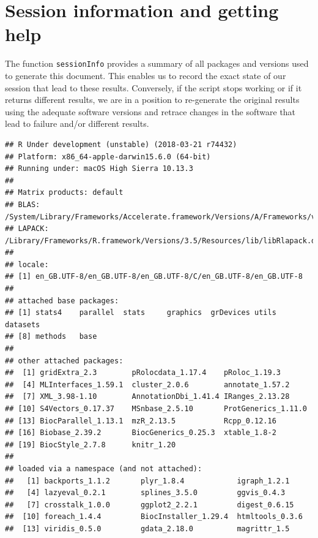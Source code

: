 \section*{Session information and getting help}

The function \texttt{sessionInfo} provides a summary of all packages
and versions used to generate this document. This enables us to record
the exact state of our session that lead to these results. Conversely,
if the script stops working or if it returns different results, we are
in a position to re-generate the original results using the adequate
software versions and retrace changes in the software that lead to
failure and/or different results.

\begin{knitrout}
\color{fgcolor}\begin{kframe}
\begin{alltt}
\hlstd{()}
\end{alltt}
\begin{verbatim}
## R Under development (unstable) (2018-03-21 r74432)
## Platform: x86_64-apple-darwin15.6.0 (64-bit)
## Running under: macOS High Sierra 10.13.3
## 
## Matrix products: default
## BLAS: /System/Library/Frameworks/Accelerate.framework/Versions/A/Frameworks/vecLib.framework/Versions/A/libBLAS.dylib
## LAPACK: /Library/Frameworks/R.framework/Versions/3.5/Resources/lib/libRlapack.dylib
## 
## locale:
## [1] en_GB.UTF-8/en_GB.UTF-8/en_GB.UTF-8/C/en_GB.UTF-8/en_GB.UTF-8
## 
## attached base packages:
## [1] stats4    parallel  stats     graphics  grDevices utils     datasets 
## [8] methods   base     
## 
## other attached packages:
##  [1] gridExtra_2.3        pRolocdata_1.17.4    pRoloc_1.19.3       
##  [4] MLInterfaces_1.59.1  cluster_2.0.6        annotate_1.57.2     
##  [7] XML_3.98-1.10        AnnotationDbi_1.41.4 IRanges_2.13.28     
## [10] S4Vectors_0.17.37    MSnbase_2.5.10       ProtGenerics_1.11.0 
## [13] BiocParallel_1.13.1  mzR_2.13.5           Rcpp_0.12.16        
## [16] Biobase_2.39.2       BiocGenerics_0.25.3  xtable_1.8-2        
## [19] BiocStyle_2.7.8      knitr_1.20          
## 
## loaded via a namespace (and not attached):
##   [1] backports_1.1.2       plyr_1.8.4            igraph_1.2.1         
##   [4] lazyeval_0.2.1        splines_3.5.0         ggvis_0.4.3          
##   [7] crosstalk_1.0.0       ggplot2_2.2.1         digest_0.6.15        
##  [10] foreach_1.4.4         BiocInstaller_1.29.4  htmltools_0.3.6      
##  [13] viridis_0.5.0         gdata_2.18.0          magrittr_1.5         

\end{verbatim}
\end{kframe}
\end{knitrout}
